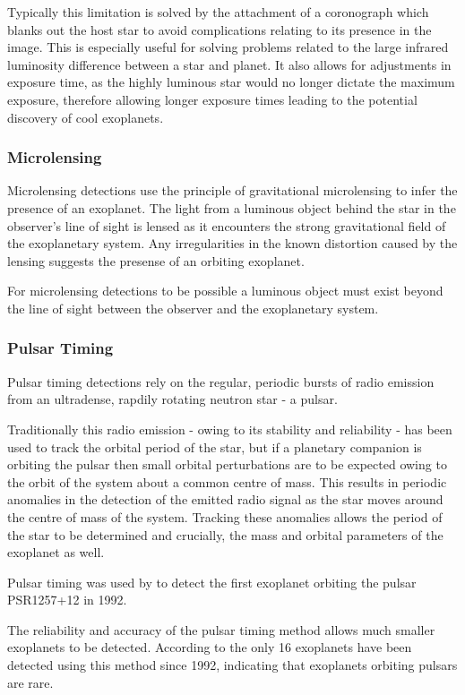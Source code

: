 \documentclass[twoside]{article}
\begin{document}
\begin{multicols}{2}
Typically this limitation is solved by the attachment of a coronograph which blanks out the host star to avoid complications relating to its presence in the image. This is especially useful for solving problems related to the large infrared luminosity difference between a star and planet. It also allows for adjustments in exposure time, as the highly luminous star would no longer dictate the maximum exposure, therefore allowing longer exposure times leading to the potential discovery of cool exoplanets. 

\subsubsection{Microlensing }
Microlensing detections use the principle of gravitational microlensing to infer the presence of an exoplanet. The light from a luminous object behind the star in the observer's line of sight is lensed as it encounters the strong gravitational field of the exoplanetary system. Any irregularities in the known distortion caused by the lensing suggests the presense of an orbiting exoplanet.  

For microlensing detections to be possible a luminous object must exist beyond the line of sight between the observer and the exoplanetary system.

\subsubsection{Pulsar Timing}
Pulsar timing detections rely on the regular, periodic bursts of radio emission from an ultradense, rapdily rotating neutron star - a pulsar. 

Traditionally this radio emission - owing to its stability and reliability - has been used to track the orbital period of the star, but if a planetary companion is orbiting the pulsar then small orbital perturbations are to be expected owing to the orbit of the system about a common centre of mass. This results in periodic anomalies in the detection of the emitted radio signal as the star moves around the centre of mass of the system. Tracking these anomalies allows the period of the star to be determined and crucially, the mass and orbital parameters of the exoplanet as well.

Pulsar timing was used by \citeauthor{first} to detect the first exoplanet orbiting the pulsar PSR1257+12 in 1992. 

The reliability and accuracy of the pulsar timing method allows much smaller exoplanets to be detected. According to the \cite{exo} only 16 exoplanets have been detected using this method since 1992, indicating that exoplanets orbiting pulsars are rare.


\end{multicols}
\end{document}
